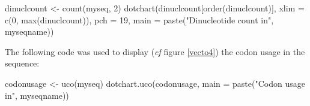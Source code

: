 \documentclass{article}
\begin{document}
\begin{figure}
\centering{}
\end{figure}

\begin{Schunk}
\begin{Sinput}
 dinuclcount <- count(myseq, 2)
 dotchart(dinuclcount[order(dinuclcount)], xlim = c(0, max(dinuclcount)), pch = 19,
   main = paste("Dinucleotide count in",  myseqname))
\end{Sinput}
\end{Schunk}

The following code was used to display (\textit{cf} figure \ref{vecto4}) 
the codon usage in the sequence:

\begin{figure}
\centering{}
\end{figure}

\begin{Schunk}
\begin{Sinput}
 codonusage <- uco(myseq)
 dotchart.uco(codonusage, main = paste("Codon usage in",  myseqname))
\end{Sinput}
\end{Schunk}

\clearpage
\end{document}
